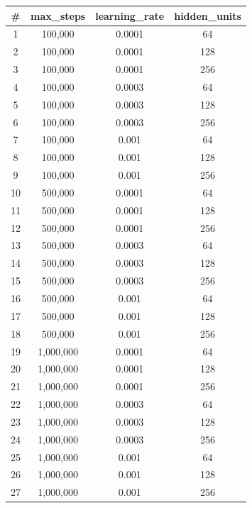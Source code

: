 \begin{table}[H]
    \centering
    \begin{tabular}{|c|c|c|c|}
        \hline
        \textbf{\#} & \textbf{max\_steps} & \textbf{learning\_rate} & \textbf{hidden\_units} \\
        \hline
        1  & 100,000   & 0.0001 & 64 \\
        \hline
        2  & 100,000   & 0.0001 & 128 \\
        \hline
        3  & 100,000   & 0.0001 & 256 \\
        \hline
        4  & 100,000   & 0.0003 & 64 \\
        \hline
        5  & 100,000   & 0.0003 & 128 \\
        \hline
        6  & 100,000   & 0.0003 & 256 \\
        \hline
        7  & 100,000   & 0.001  & 64 \\
        \hline
        8  & 100,000   & 0.001  & 128 \\
        \hline
        9  & 100,000   & 0.001  & 256 \\
        \hline
        10 & 500,000   & 0.0001 & 64 \\
        \hline
        11 & 500,000   & 0.0001 & 128 \\
        \hline
        12 & 500,000   & 0.0001 & 256 \\
        \hline
        13 & 500,000   & 0.0003 & 64 \\
        \hline
        14 & 500,000   & 0.0003 & 128 \\
        \hline
        15 & 500,000   & 0.0003 & 256 \\
        \hline
        16 & 500,000   & 0.001  & 64 \\
        \hline
        17 & 500,000   & 0.001  & 128 \\
        \hline
        18 & 500,000   & 0.001  & 256 \\
        \hline
        19 & 1,000,000 & 0.0001 & 64 \\
        \hline
        20 & 1,000,000 & 0.0001 & 128 \\
        \hline
        21 & 1,000,000 & 0.0001 & 256 \\
        \hline
        22 & 1,000,000 & 0.0003 & 64 \\
        \hline
        23 & 1,000,000 & 0.0003 & 128 \\
        \hline
        24 & 1,000,000 & 0.0003 & 256 \\
        \hline
        25 & 1,000,000 & 0.001  & 64 \\
        \hline
        26 & 1,000,000 & 0.001  & 128 \\
        \hline
        27 & 1,000,000 & 0.001  & 256 \\
        \hline
    \end{tabular}
    \label{tab:hyperparams_full}
\end{table}